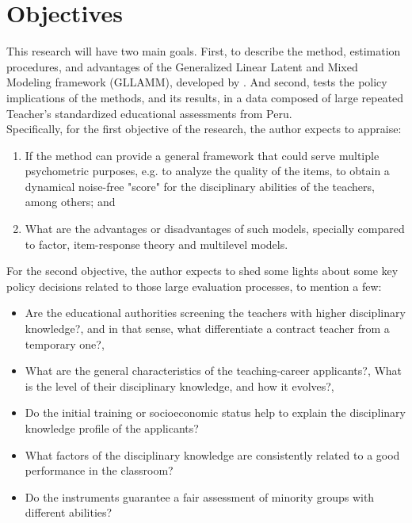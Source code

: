 \section{Objectives}

This research will have two main goals. First, to describe the method, estimation procedures, and advantages of the Generalized Linear Latent and Mixed Modeling framework (GLLAMM), developed by \citet{Rabe_et_al_2004a, Rabe_et_al_2004b, Skrondal_et_al_2004a, Rabe_et_al_2012}. And second, tests the policy implications of the methods, and its results, in a data composed of large repeated Teacher's standardized educational assessments from Peru. \\

\noindent Specifically, for the first objective of the research, the author expects to appraise: 

\begin{enumerate}
	\item If the method can provide a general framework that could serve multiple psychometric purposes, e.g. to analyze the quality of the items, to obtain a dynamical noise-free "score" for the disciplinary abilities of the teachers, among others; and
	
	\item What are the advantages or disadvantages of such models, specially compared to factor, item-response theory and multilevel models.
\end{enumerate}

\noindent For the second objective, the author expects to shed some lights about some key policy decisions related to those large evaluation processes, to mention a few:

\begin{itemize}
	\item Are the educational authorities screening the teachers with higher disciplinary knowledge?, and in that sense, what differentiate a contract teacher from a temporary one?,
	
	\item What are the general characteristics of the teaching-career applicants?, What is the level of their disciplinary knowledge, and how it evolves?, 
	
	\item Do the initial training or socioeconomic status help to explain the disciplinary knowledge profile of the applicants?
	
	\item What factors of the disciplinary knowledge are consistently related to a good performance in the classroom?
	
	\item Do the instruments guarantee a fair assessment of minority groups with different abilities?
\end{itemize}

